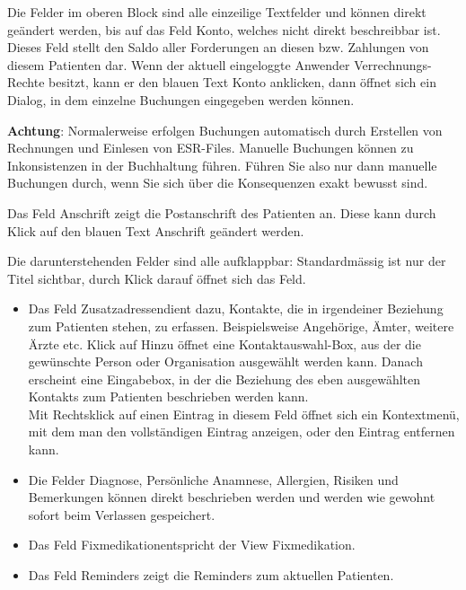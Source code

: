 Die Felder im oberen Block sind alle einzeilige Textfelder und können direkt geändert
werden, bis auf das Feld \glqq Konto\grqq{}, welches nicht direkt beschreibbar
ist. Dieses Feld stellt den Saldo aller Forderungen an diesen bzw. Zahlungen von
diesem Patienten dar. Wenn der aktuell eingeloggte Anwender Verrechnungs-Rechte
besitzt, kann er den blauen Text \glqq Konto\grqq{} anklicken, dann öffnet sich
ein Dialog, in dem einzelne Buchungen eingegeben werden können.

\textbf{Achtung}: Normalerweise erfolgen Buchungen automatisch durch Erstellen
von Rechnungen und Einlesen von ESR-Files. Manuelle Buchungen können zu
Inkonsistenzen in der Buchhaltung führen. Führen Sie also nur dann manuelle
Buchungen durch, wenn Sie sich über die Konsequenzen exakt bewusst sind.

Das Feld \glqq Anschrift\grqq{} zeigt die Postanschrift des Patienten an. Diese
kann durch Klick auf den blauen Text \glqq Anschrift \grqq{}geändert werden.

Die darunterstehenden Felder sind alle aufklappbar: Standardmässig ist nur der
Titel sichtbar, durch Klick darauf öffnet sich das Feld.
\begin{itemize}
  \item Das Feld \glqq Zusatzadressen\grqq{}dient dazu, Kontakte, die in
  irgendeiner Beziehung zum Patienten stehen, zu erfassen. Beispielsweise
  Angehörige, Ämter, weitere Ärzte etc. Klick auf \glqq Hinzu\grqq{} öffnet eine
  Kontaktauswahl-Box, aus der die gewünschte Person oder Organisation ausgewählt
  werden kann. Danach erscheint eine Eingabebox, in der die Beziehung des eben
  ausgewählten Kontakts zum Patienten beschrieben werden kann. \\
  Mit Rechtsklick auf einen Eintrag in diesem Feld öffnet sich ein Kontextmenü,
  mit dem man den vollständigen Eintrag anzeigen, oder den Eintrag entfernen kann.
  \item Die Felder \glqq Diagnose\grqq, \glqq Persönliche Anamnese\grqq{},
  \glqq Allergien\grqq{}, \glqq Risiken\grqq{} und \glqq Bemerkungen\grqq{}
  können direkt beschrieben werden und werden wie gewohnt sofort beim Verlassen
  gespeichert.
  \item Das Feld \glqq Fixmedikation\grqq{}entspricht der View Fixmedikation.
  \item Das Feld \glqq Reminders\grqq{} zeigt die Reminders zum aktuellen Patienten.
\end{itemize}
